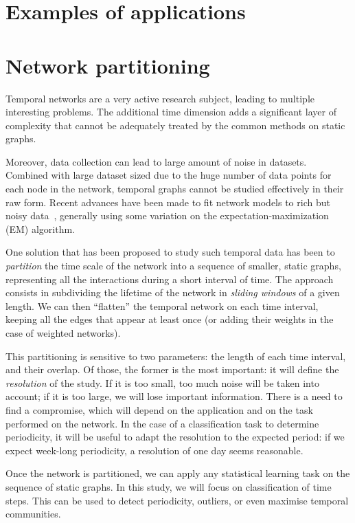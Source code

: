 \documentclass[a4paper,11pt,openany,extrafontsizes]{memoir}
\begin{document}
\section{Examples of applications}%
\label{sec:exampl-appl}

\section{Network partitioning}%
\label{sec:network-partitioning}

Temporal networks are a very active research subject, leading to
multiple interesting problems. The additional time dimension adds a
significant layer of complexity that cannot be adequately treated by
the common methods on static graphs.

Moreover, data collection can lead to large amount of noise in
datasets. Combined with large dataset sized due to the huge number of
data points for each node in the network, temporal graphs cannot be
studied effectively in their raw form. Recent advances have been made
to fit network models to rich but noisy
data~\cite{newman_network_2018}, generally using some variation on the
expectation-maximization (EM) algorithm.

One solution that has been proposed to study such temporal data has
been to \emph{partition} the time scale of the network into a sequence
of smaller, static graphs, representing all the interactions during a
short interval of time. The approach consists in subdividing the
lifetime of the network in \emph{sliding windows} of a given length.
We can then ``flatten'' the temporal network on each time interval,
keeping all the edges that appear at least once (or adding their
weights in the case of weighted networks).

This partitioning is sensitive to two parameters: the length of each
time interval, and their overlap. Of those, the former is the most
important: it will define the \emph{resolution} of the study. If it is
too small, too much noise will be taken into account; if it is too
large, we will lose important information. There is a need to find a
compromise, which will depend on the application and on the task
performed on the network. In the case of a classification task to
determine periodicity, it will be useful to adapt the resolution to
the expected period: if we expect week-long periodicity, a resolution
of one day seems reasonable.

Once the network is partitioned, we can apply any statistical learning
task on the sequence of static graphs. In this study, we will focus on
classification of time steps. This can be used to detect periodicity,
outliers, or even maximise temporal communities.
\end{document}
